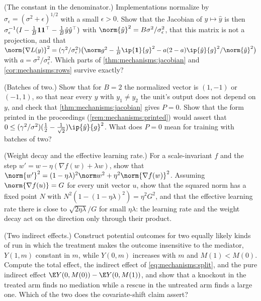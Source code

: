 \begin{refsection}
\begin{exercises}
\item \consolidation\hard (The constant in the denominator.) Implementations normalize by $\sigma_\epsilon=(\sigma^2+\epsilon)^{1/2}$ with a small $\epsilon>0$. Show that the Jacobian of $y\mapsto\hat y$ is then $\sigma_\epsilon^{-1}(I-\frac1B\mathbf{1}\mathbf{1}^\top-\frac1B\hat y\hat y^\top)$ with $\norm{\hat y}^2=B\sigma^2/\sigma_\epsilon^2$, that this matrix is not a projection, and that $\norm{\nabla L(y)}^2=(\gamma^2/\sigma_\epsilon^2)\bigl(\norm g^2-\frac1B\ip{\mechanismsones}{g}^2-a(2-a)\ip{\hat y}{g}^2/\norm{\hat y}^2\bigr)$ with $a=\sigma^2/\sigma_\epsilon^2$. Which parts of \cref{thm:mechanisms:jacobian} and \cref{cor:mechanisms:rows} survive exactly? \label{ex:mechanisms:epsilon}

\item \consolidation (Batches of two.) Show that for $B=2$ the normalized vector is $(1,-1)$ or $(-1,1)$, so that near every $y$ with $y_1\neq y_2$ the unit's output does not depend on $y$, and check that \cref{thm:mechanisms:jacobian} gives $P=0$. Show that the form printed in the proceedings (\cref{rem:mechanisms:printed}) would assert that $0\le(\gamma^2/\sigma^2)(\frac12-\frac1{\sqrt2})\ip{\hat y}{g}^2$. What does $P=0$ mean for training with batches of two?\label{ex:mechanisms:two}

\item \consolidation (Weight decay and the effective learning rate.) For a scale-invariant $f$ and the step $w'=w-\eta(\nabla f(w)+\lambda w)$, show that $\norm{w'}^2=(1-\eta\lambda)^2\norm w^2+\eta^2\norm{\nabla f(w)}^2$. Assuming $\norm{\nabla f(u)}=G$ for every unit vector $u$, show that the squared norm has a fixed point $N$ with $N^2(1-(1-\eta\lambda)^2)=\eta^2G^2$, and that the effective learning rate there is close to $\sqrt{2\eta\lambda}/G$ for small $\eta\lambda$: the learning rate and the weight decay act on the direction only through their product.\label{ex:mechanisms:decay}

\item \consolidation (Two indirect effects.) Construct potential outcomes for two equally likely kinds of run in which the treatment makes the outcome insensitive to the mediator, $Y(1,m)$ constant in $m$, while $Y(0,m)$ increases with $m$ and $M(1)<M(0)$. Compute the total effect, the indirect effect of \eqref{eq:mechanisms:split}, and the pure indirect effect $\E Y(0,M(0))-\E Y(0,M(1))$, and show that a knockout in the treated arm finds no mediation while a rescue in the untreated arm finds a large one. Which of the two does the covariate-shift claim assert?\label{ex:mechanisms:interaction}


\end{exercises}
\end{refsection}
